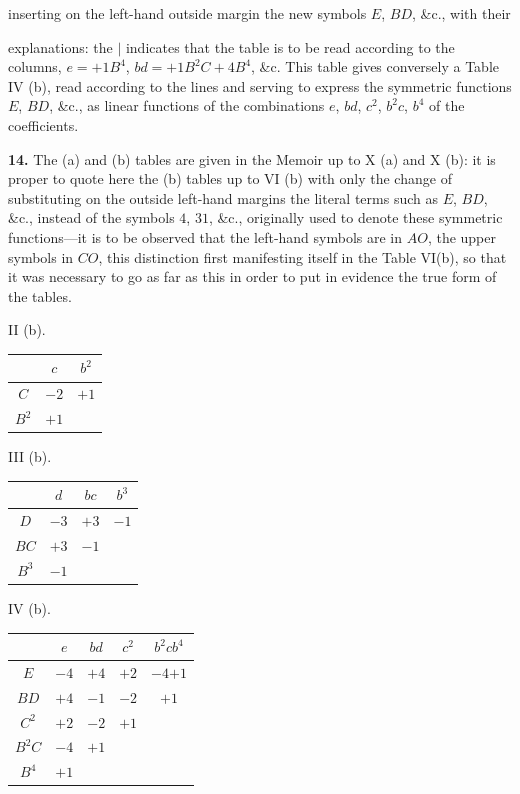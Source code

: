 \documentclass[11pt]{article}
\begin{document}
inserting on the left-hand outside margin the new symbols $E$, $BD$, \&c., with their

explanations: the $|$ indicates that the table is to be read according to the columns, $e = +1 B^4$, $bd = +1 B^2 C + 4 B^4$, \&c. This table gives conversely a Table IV (b), read according to the lines and serving to express the symmetric functions $E$, $BD$, \&c., as linear functions of the combinations $e$, $bd$, $c^2$, $b^2 c$, $b^4$ of the coefficients.

\textbf{14.} The (a) and (b) tables are given in the Memoir up to X (a) and X (b): it is proper to quote here the (b) tables up to VI (b) with only the change of substituting on the outside left-hand margins the literal terms such as $E$, $BD$, \&c., instead of the symbols $4$, $31$, \&c., originally used to denote these symmetric functions---it is to be observed that the left-hand symbols are in $AO$, the upper symbols in $CO$, this distinction first manifesting itself in the Table VI(b), so that it was necessary to go as far as this in order to put in evidence the true form of the tables.

\begin{center}
\renewcommand{\arraystretch}{1.15}
II (b).\\[0.3em]
\begin{tabular}{c|cc}
   & $c$ & $b^2$ \\ \hline
$C$ & $-2$ & $+1$ \\
$B^2$ & $+1$ & \\
\end{tabular}
\qquad
III (b).\\[0.3em]
\begin{tabular}{c|ccc}
   & $d$ & $bc$ & $b^3$ \\ \hline
$D$ & $-3$ & $+3$ & $-1$ \\
$BC$ & $+3$ & $-1$ & \\
$B^3$ & $-1$ & & \\
\end{tabular}
\qquad
IV (b).\\[0.3em]
\begin{tabular}{c|cccc}
   & $e$ & $bd$ & $c^2$ & $b^2 c$\;$b^4$ \\ \hline
$E$ & $-4$ & $+4$ & $+2$ & $-4$\;$+1$ \\
$BD$ & $+4$ & $-1$ & $-2$ & $+1$\; \\
$C^2$ & $+2$ & $-2$ & $+1$ & \; \\
$B^2 C$ & $-4$ & $+1$ & & \; \\
$B^4$ & $+1$ & & & \; \\
\end{tabular}
\end{center}
\end{document}
